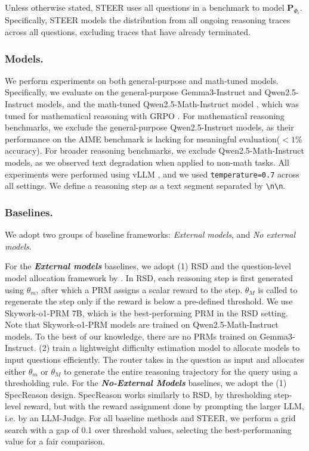 \documentclass[letterpaper]{article} %
\begin{document}
Unless otherwise stated, STEER uses all questions in a benchmark to model $\mathbf{P}_{\Phi_i}$. Specifically, STEER models the distribution from all ongoing reasoning traces across all questions, excluding traces that have already terminated.

\subsubsection{Models.}
We perform experiments on both general-purpose and math-tuned models. Specifically, we evaluate on the general-purpose Gemma3-Instruct \citep{team2025gemma} and Qwen2.5-Instruct \citep{qwen2025qwen25technicalreport} models, and the math-tuned Qwen2.5-Math-Instruct model \citep{yang2024qwen25mathtechnicalreportmathematical}, which was tuned for mathematical reasoning with GRPO \citep{shao2024deepseekmath}. For mathematical reasoning benchmarks, 
we exclude the general-purpose Qwen2.5-Instruct models, as their performance on the AIME benchmark is lacking for meaningful evaluation($<1\%$ accuracy). For broader reasoning benchmarks, we exclude Qwen2.5-Math-Instruct models, as we observed text degradation when applied to non-math tasks. All experiments were performed using vLLM \citep{kwon2023efficient}, and we used \texttt{temperature=0.7} across all settings. We define a reasoning step as a text segment separated by \texttt{\textbackslash n\textbackslash n}.

\subsubsection{Baselines.}
We adopt two groups of baseline frameworks: \textit{External models}, and \textit{No external models}.

For the \textbf{\textit{External models}} baselines, we adopt (1) RSD \citep{liaoreward} and the question-level model allocation framework by \citet{damani2024learninghardthinkinputadaptive}. In RSD, each reasoning step is first generated using $\theta_m$, after which a PRM assigns a scalar reward to the step. $\theta_M$ is called to regenerate the step only if the reward is below a pre-defined threshold. We use Skywork-o1-PRM 7B\citep{skywork2024}, which is the best-performing PRM in the RSD setting. Note that Skywork-o1-PRM models are trained on Qwen2.5-Math-Instruct models. To the best of our knowledge, there are no PRMs trained on Gemma3-Instruct. (2) \citet{damani2024learninghardthinkinputadaptive} train a lightweight difficulty estimation model to allocate models to input questions efficiently. 
The router takes in the question as input and allocates either $\theta_m$ or $\theta_M$ to generate the entire reasoning trajectory for the query using a thresholding rule. For the \textbf{\textit{No-External Models}} baselines, we adopt the (1) SpecReason \citep{pan2025specreason} design. SpecReason works similarly to RSD, by thresholding step-level reward, but with the reward assignment done by prompting the larger LLM, i.e. by an LLM-Judge. For all baseline methods and STEER, we perform a grid search with a gap of 0.1 over threshold values, selecting the best-performaning value for a fair comparison. 
\end{document}
